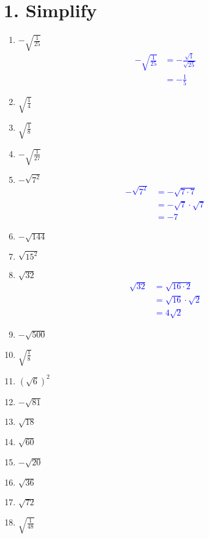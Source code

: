 \documentclass[fleqn,12pt]{article}
\newcommand{\studentlargeworkspace}{\vspace{2.5cm}}
\begin{document}
\section*{\normalsize 1. Simplify}
\begin{enumerate}[label=\alph*.]
    \item $-\sqrt{\frac{1}{25}}$
        \textcolor{blue}{
        \begin{align*}
            -\sqrt{\frac{1}{25}} &= -\frac{\sqrt{1}}{\sqrt{25}} \\
                                 &= -\frac{1}{5}
        \end{align*}
        }
    \item $\sqrt{\frac{1}{4}}$
        \studentlargeworkspace
    \item $\sqrt{\frac{1}{8}}$
        \studentlargeworkspace
    \item $-\sqrt{\frac{1}{27}}$
        \studentlargeworkspace
    \item $-\sqrt{7^2}$
        \textcolor{blue}{
        \begin{align*}
            -\sqrt{7^2} &= -\sqrt{7 \cdot 7} \\
                        &= -\sqrt{7} \cdot \sqrt{7} \\
                        &= -7
        \end{align*}
        }
    \item $-\sqrt{144}$
        \studentlargeworkspace
    \item $\sqrt{15^2}$
        \studentlargeworkspace
    \item $\sqrt{32}$
        \textcolor{blue}{
        \begin{align*}
            \sqrt{32} &= \sqrt{16 \cdot 2} \\
                      &= \sqrt{16} \cdot \sqrt{2} \\
                      &= 4 \sqrt{2}
        \end{align*}
        }
    \item $-\sqrt{500}$
        \studentlargeworkspace
    \item $\sqrt{\frac{1}{8}}$
        \studentlargeworkspace
    \item $(\sqrt{6})^2$
        \studentlargeworkspace
    \item $-\sqrt{81}$
        \studentlargeworkspace
    \item $\sqrt{18}$
        \studentlargeworkspace
    \item $\sqrt{60}$
        \studentlargeworkspace
    \item $-\sqrt{20}$
        \studentlargeworkspace
    \item $\sqrt{36}$
        \studentlargeworkspace
    \item $\sqrt{72}$
        \studentlargeworkspace
    \item $\sqrt{\frac{1}{48}}$
        \studentlargeworkspace
    \end{enumerate}
\end{document}
